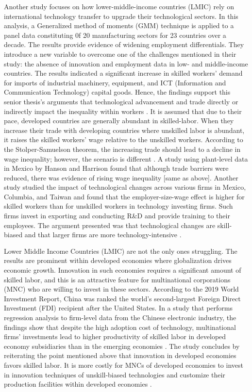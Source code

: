 Another study focuses on how lower-middle-income countries (LMIC) rely on international technology transfer to upgrade their technological sectors. In this analysis, a Generalized method of moments (GMM) technique is applied to a panel data constituting 0f 20 manufacturing sectors for 23 countries over a decade. The results provide evidence of widening employment differentials. They introduce a new variable to overcome one of the challenges mentioned in their study: the absence of innovation and employment data in low- and middle-income countries. The results indicated a significant increase in skilled workers' demand for imports of industrial machinery, equipment, and ICT (Information and Communication Technology) capital goods. Hence, the findings support this senior thesis's arguments that technological advancement and trade directly or indirectly impact the inequality within workers \cite{conte2011imported}. It is assumed that due to their pace, developed countries are generally abundant in skilled-labor. When they increase their trade with developing countries where unskilled labor is abundant, it raises the skilled workers' wage relative to the unskilled workers. According to the Stolper-Samuelson theorem, the increasing trade should lead to a decline in wage inequality; however, the scenario is different \cite{gorg2002relative}. A study using plant-level data in Mexico by Hanson and Harrison found that although trade barriers were reduced, there was evidence of rising wage inequality [same as above]. Another study studied the impact of technological changes across various firms in Mexico, Columbia, and Taiwan and found that the employer-size-wage effect is higher for skilled workers than for unskilled workers in technology investing firms. Such firms invest in exporting and conducting R&D and provide training to their employees. The argument presented was that technological changes are skill-biased and that larger firms are more technology-intensive \cite{gorg2002relative}.

Lower Middle Income Countries (LMIC) are not the only ones struggling. The results are prominent within developed economies where globalization drives economic growth. Innovation in such economies requires a significant amount of skilled labor, and this is an attractive feature for multinational corporations (MNC) who are willing to invest in these sectors. According to the 2019 World Investment Report, China was ranked the world's second-largest Foreign Direct Investment (FDI) recipient after the United States. In a study that performs regression analysis to firm-level data from the Chinese electronic industry, the findings show that despite the high adoption cost of technology, multinational firms' investments lead to higher productivity of skilled labor in developed economy subsidiaries than in the emerging economies \cite{li2010multinational}. The study concludes by reiterating the point mentioned above that innovation in developed economies favors skilled labor. It is more costly for MNCs of developed economies to invest in innovation techniques of unskill-biased technologies and customize their production facilities within developed economies \cite{li2010multinational}.


